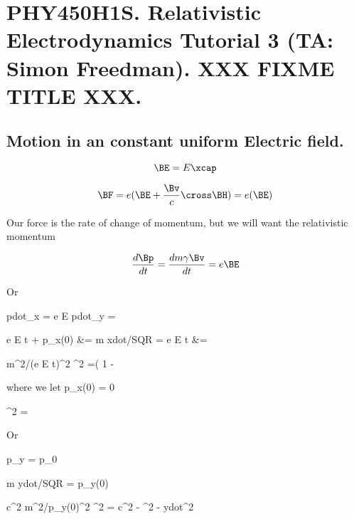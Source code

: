 
%

\chapter{PHY450H1S.  Relativistic Electrodynamics Tutorial 3 (TA: Simon Freedman).  XXX FIXME TITLE XXX.}
\label{chap:relativisticElectrodynamicsT3}
{}
\date{Feb 3, 2011}

\beginArtWithToc

\section{Motion in an constant uniform Electric field.}

\begin{equation}\label{eqn:relativisticElectrodynamicsT3:n}
\BE = E \xcap
\end{equation}

\begin{equation}\label{eqn:relativisticElectrodynamicsT3:n}
\BF = e ( \BE + \frac{\Bv}{c} \cross \BH ) = e ( \BE )
\end{equation}

Our force is the rate of change of momentum, but we will want the relativistic momentum

\begin{equation}\label{eqn:relativisticElectrodynamicsT3:n}
\frac{d\Bp}{dt} = \frac{d m \gamma \Bv}{dt} = e \BE 
\end{equation}

Or 

pdot_x = e E
pdot_y = 

e E t + p_x(0)
&=
m xdot/SQR = e E t
&= 

m^2/(e E t)^2 \xdot^2 =\left( 1 - 

where we let p_x(0) = 0

\xdot^2 = 


Or

p_y = p_0

m ydot/SQR = p_y(0)

c^2 m^2/p_y(0)^2 \ydot^2 = c^2 - \xdot^2 - ydot^2


